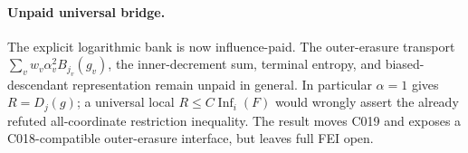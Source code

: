 \documentclass{article}
\begin{document}
\paragraph{Unpaid universal bridge.}
The explicit logarithmic bank is now influence-paid. The outer-erasure
transport $\sum_vw_v\alpha_v^2B_{j_v}(g_v)$, the inner-decrement sum,
terminal entropy, and biased-descendant representation remain unpaid in
general. In particular $\alpha=1$ gives $R=D_j(g)$; a universal local
$R\le C\operatorname{Inf}_i(F)$ would wrongly assert the already refuted
all-coordinate restriction inequality. The result moves C019 and exposes
a C018-compatible outer-erasure interface, but leaves full FEI open.
\end{document}
